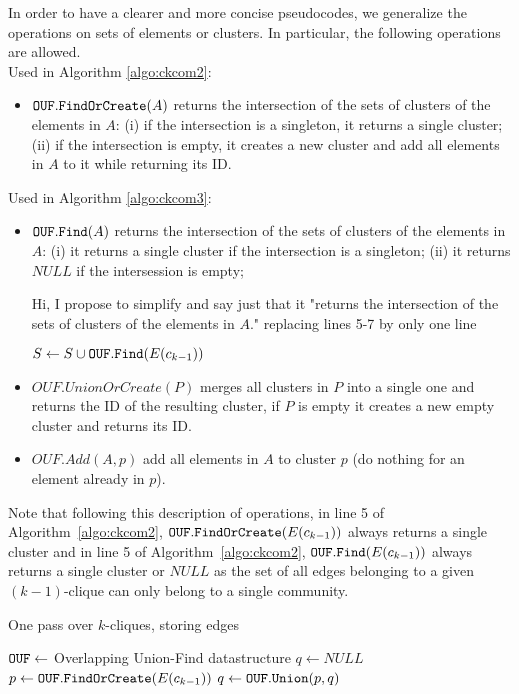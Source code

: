 In order to have a clearer and more concise pseudocodes, we generalize the operations on sets of elements or clusters. In particular, the following operations are allowed.\\
Used in Algorithm \ref{algo:ckcom2}:
 \begin{itemize}
  \item ${\tt OUF.FindOrCreate}(A)$ returns the intersection of the sets of clusters of the elements in $A$: (i) if the intersection is a singleton, it returns a single cluster; (ii) if the intersection is empty, it creates a new cluster and add all elements in $A$ to it while returning its ID.
 \end{itemize}
Used in Algorithm \ref{algo:ckcom3}:
 \begin{itemize}
  \item ${\tt OUF.Find}(A)$ returns the intersection of the sets of clusters of the elements in $A$: (i) it returns a single cluster if the intersection is a singleton; (ii) it returns $NULL$ if the intersession is empty;
  
{  \color{red}
Hi, I propose to simplify and say just that 
it "returns the intersection of the sets of clusters of the elements in $A$." replacing lines 5-7 by only one line

        $S \leftarrow S \cup {\tt OUF.Find}(E(c_{k-1}))$
}
  \item $OUF.UnionOrCreate(P)$ merges all clusters in $P$ into a single one and returns the ID of the resulting cluster, if $P$ is empty it creates a new empty cluster and returns its ID.
  \item $OUF.Add(A,p)$ add all elements in $A$ to cluster $p$ (do nothing for an element already in $p$).
\end{itemize}

Note that following this description of operations, in line 5 of Algorithm~\ref{algo:ckcom2}, 
${\tt OUF.FindOrCreate}(E(c_{k-1}))$ always returns a single cluster and in line 5 of Algorithm~\ref{algo:ckcom2}, ${\tt OUF.Find}(E(c_{k-1}))$ always returns a single cluster or $NULL$ 
as the set of all edges belonging to a given $(k-1)$-clique can only belong to a single community.
\vspace{0.3cm}

\begin{algorithm}[!htbp]
\caption{One pass over $k$-cliques, storing edges}
\label{algo:ckcom2}
\begin{algorithmic}[1]
  \State ${\tt OUF} \leftarrow$ Overlapping Union-Find datastructure 
        \State $q \leftarrow NULL$
      		\State $p \leftarrow {\tt OUF.FindOrCreate} (E(c_{k-1}))$
          	\State $q \leftarrow {\tt OUF.Union} (p,q) $ 
      	\EndFor
\EndFor
\end{algorithmic}

\end{algorithm}

